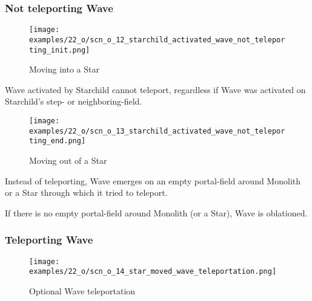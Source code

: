 \subsubsection*{Not teleporting Wave}

\noindent
\begin{wrapfigure}[4]{l}{0.4\textwidth}
\centering
\texttt{[image: examples/22\_o/scn\_o\_12\_starchild\_activated\_wave\_not\_teleporting\_init.png]}
\caption{Moving into a Star}
\label{fig:scn_o_12_starchild_activated_wave_not_teleporting_init}
\end{wrapfigure}
Wave activated by Starchild cannot teleport, regardless if Wave was activated on Starchild's
step- or neighboring-field.

\vspace*{7.1\baselineskip}
\noindent
\begin{wrapfigure}[7]{l}{0.4\textwidth}
\centering
\texttt{[image: examples/22\_o/scn\_o\_13\_starchild\_activated\_wave\_not\_teleporting\_end.png]}
\caption{Moving out of a Star}
\label{fig:scn_o_13_starchild_activated_wave_not_teleporting_end}
\end{wrapfigure}
Instead of teleporting, Wave emerges on an empty portal-field around Monolith or a Star through
which it tried to teleport.

If there is no empty portal-field around Monolith (or a Star), Wave is oblationed.

\clearpage %

\subsubsection*{Teleporting Wave}

\vspace*{-0.9\baselineskip}
\noindent
\begin{figure}[!h]
\texttt{[image: examples/22\_o/scn\_o\_14\_star\_moved\_wave\_teleportation.png]}
\caption{Optional Wave teleportation}
\label{fig:scn_o_14_star_moved_wave_teleportation}
\end{figure}

